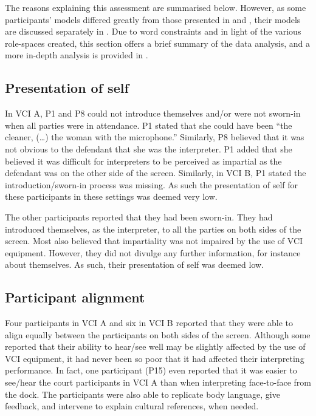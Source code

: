 \documentclass[output=paper]{langsci/langscibook}
\begin{document}
The reasons explaining this assessment are summarised below. However, as some participants’ models differed greatly from those presented in  and , their models are discussed separately in . Due to word constraints and in light of the various role-spaces created, this section offers a brief summary of the data analysis, and a more in-depth analysis is provided in \citet{Devaux2017b}.

\subsection{Presentation of self}
In \textsc{VCI} A, P1 and P8 could not introduce themselves and/or were not sworn-in when all parties were in attendance. P1 stated that she could have been “the cleaner, (…) the woman with the microphone.” Similarly, P8 believed that it was not obvious to the defendant that she was the interpreter. P1 added that she believed it was difficult for interpreters to be perceived as impartial as the defendant was on the other side of the screen. Similarly, in \textsc{VCI} B, P1 stated the introduction/sworn-in process was missing. As such the presentation of self for these participants in these settings was deemed very low. 

The other participants reported that they had been sworn-in. They had introduced themselves, as the interpreter, to all the parties on both sides of the screen. Most also believed that impartiality was not impaired by the use of \textsc{VCI} equipment. However, they did not divulge any further information, for instance about themselves. As such, their presentation of self was deemed low.

\subsection{Participant alignment}
Four participants in \textsc{VCI} A and six in \textsc{VCI} B reported that they were able to align equally between the participants on both sides of the screen. Although some reported that their ability to hear/see well may be slightly affected by the use of \textsc{VCI} equipment, it had never been so poor that it had affected their interpreting performance. In fact, one participant (P15) even reported that it was easier to see/hear the court participants in \textsc{VCI} A than when interpreting face-to-face from the dock. The participants were also able to replicate body language, give feedback, and intervene to explain cultural references, when needed. 
\end{document}
